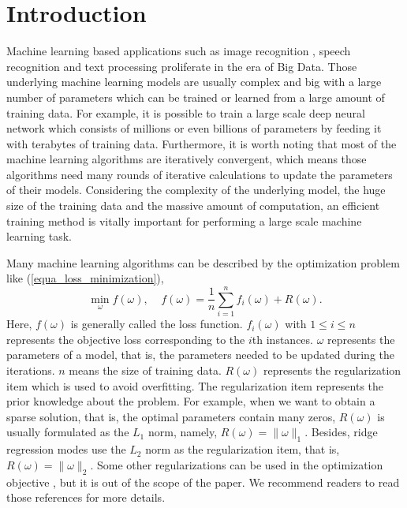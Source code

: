 \documentclass[preprint,review,11pt,a4paper]{elsarticle}
\begin{document}
\section{Introduction}
\label{introduction}

Machine learning based applications such as image recognition \cite{Coates2011An}, speech recognition \cite{dahl2012context} and text processing \cite{collobert2008unified} proliferate in the era of Big Data. Those underlying machine learning models are usually complex and big with a large number of parameters which can be trained or learned from a large amount of training data. For example, it is possible to train a large scale deep neural network which consists of millions or even billions of parameters by feeding it with terabytes of training data. Furthermore, it is worth noting that most of the machine learning algorithms are iteratively convergent, which means those algorithms need many rounds of iterative calculations to update the parameters of their models. Considering the complexity of the underlying model, the huge size of the training data and the massive amount of computation, an efficient training method is vitally important for performing a large scale machine learning task.

Many machine learning algorithms can be described by the optimization problem like (\ref{equa_loss_minimization}),
\begin{equation}
\label{equa_loss_minimization}
\min_\omega f(\omega),~~~~~f(\omega)=\frac{1}{n}\sum\limits_{i=1}^n f_i(\omega) + R(\omega).
\end{equation}  Here, $f(\omega)$ is generally called the loss function. $f_i(\omega)$ with $1\le i\le n$ represents the objective loss corresponding to the $i$th instances.  $\omega$ represents the parameters of a model, that is, the parameters needed to be updated during the iterations. $n$ means the size of training data. $R(\omega)$ represents the regularization item which is used to avoid overfitting. The regularization item represents the prior knowledge about the problem. For example, when we want to obtain a sparse solution, that is, the optimal parameters contain many zeros, $R(\omega)$ is usually formulated as the $L_1$ norm, namely, $R(\omega) = \lVert \omega \rVert_1$. Besides, ridge regression modes use the $L_2$ norm as the regularization item, that is, $R(\omega) = \lVert \omega \rVert_2$. Some other regularizations can be used in the optimization objective \cite{Vidaurre:2013cu, Gnecco2015Learning, Cucker2002On}, but it is out of the scope of the paper. We recommend readers to read those references for more details. 
\end{document}
